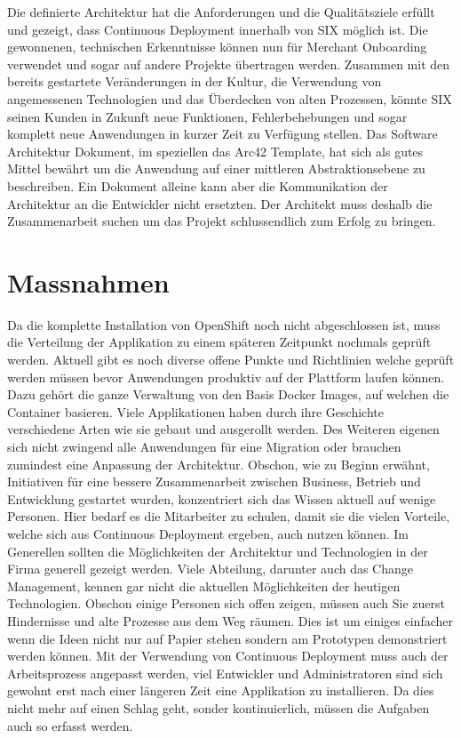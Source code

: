 Die definierte Architektur hat die Anforderungen und die Qualitätsziele erfüllt und gezeigt, dass Continuous Deployment innerhalb von SIX möglich ist. Die gewonnenen, technischen Erkenntnisse können nun für Merchant Onboarding verwendet und sogar auf andere Projekte übertragen werden. Zusammen mit den bereits gestartete Veränderungen in der Kultur, die Verwendung von angemessenen Technologien und das Überdecken von alten Prozessen, könnte SIX seinen Kunden in Zukunft neue Funktionen, Fehlerbehebungen und sogar komplett neue Anwendungen in kurzer Zeit zu Verfügung stellen.\newline
Das Software Architektur Dokument, im speziellen das Arc42 Template, hat sich als gutes Mittel bewährt um die Anwendung auf einer mittleren Abstraktionsebene zu beschreiben. Ein Dokument alleine kann aber die Kommunikation der Architektur an die Entwickler nicht ersetzten. Der Architekt muss deshalb die Zusammenarbeit suchen um das Projekt schlussendlich zum Erfolg zu bringen.

\chapter{Massnahmen}
Da die komplette Installation von OpenShift noch nicht abgeschlossen ist, muss die Verteilung der Applikation zu einem späteren Zeitpunkt nochmals geprüft werden. Aktuell gibt es noch diverse offene Punkte und Richtlinien welche geprüft werden müssen bevor Anwendungen produktiv auf der Plattform laufen können. Dazu gehört die ganze Verwaltung von den Basis Docker Images, auf welchen die Container basieren. Viele Applikationen haben durch ihre Geschichte verschiedene Arten wie sie gebaut und ausgerollt werden. Des Weiteren eigenen sich nicht zwingend alle Anwendungen für eine Migration oder brauchen zumindest eine Anpassung der Architektur. Obschon, wie zu Beginn erwähnt, Initiativen für eine bessere Zusammenarbeit zwischen Business, Betrieb und Entwicklung gestartet wurden, konzentriert sich das Wissen aktuell auf wenige Personen. Hier bedarf es die Mitarbeiter zu schulen, damit sie die vielen Vorteile, welche sich aus Continuous Deployment ergeben, auch nutzen können.\newline
Im Generellen sollten die Möglichkeiten der Architektur und Technologien in der Firma generell gezeigt werden. Viele Abteilung, darunter auch das Change Management, kennen gar nicht die aktuellen Möglichkeiten der heutigen Technologien. Obschon einige Personen sich offen zeigen, müssen auch Sie zuerst Hindernisse und alte Prozesse aus dem Weg räumen. Dies ist um einiges einfacher wenn die Ideen nicht nur auf Papier stehen sondern am Prototypen demonstriert werden können.\newline
Mit der Verwendung von Continuous Deployment muss auch der Arbeitsprozess angepasst werden, viel Entwickler und Administratoren sind sich gewohnt erst nach einer längeren Zeit eine Applikation zu installieren. Da dies nicht mehr auf einen Schlag geht, sonder kontinuierlich, müssen die Aufgaben auch so erfasst werden.